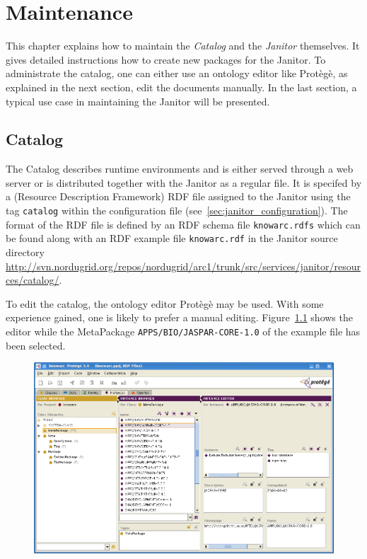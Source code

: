 \chapter{Maintenance}

This chapter explains how to maintain the {\em Catalog} and the {\em Janitor}
themselves.
It gives detailed instructions how to create new packages for the
Janitor.
To administrate the catalog, one can either use an ontology editor 
like Prot\`eg\`e, as explained in the next section, edit the documents
manually.
In the last section, a typical use case in maintaining the Janitor will
be presented.


\section{Catalog}\label{sec:catalog}

The Catalog describes runtime environments and is either served
through a web server or is distributed together with the Janitor as a
regular file.
It is specifed by a (Resource Description Framework) RDF file
assigned to the Janitor using the tag \texttt{catalog} within
the configuration file (see~\ref{sec:janitor_configuration}).
The format of the RDF file is defined by an RDF schema file
\texttt{knowarc.rdfs} which can be found along with an RDF
example file \texttt{knowarc.rdf} in the Janitor source directory
\href{http://svn.nordugrid.org/repos/nordugrid/arc1/trunk/src/services/janitor/resources/catalog/}
{http://svn.nordugrid.org/repos/nordugrid/arc1/trunk/src/services/janitor/resources/catalog/}.

To edit the catalog, the ontology editor Prot\`eg\`e may be
used. With some experience gained, one is likely to prefer a manual editing.
Figure~\ref{fig:protege_example} shows the editor while the
MetaPackage \texttt{APPS/BIO/JASPAR-CORE-1.0} of the example file has
been selected.

\begin{figure}
  \begin{center}
    \includegraphics[width=\textwidth]{images/protege_JASPAR.png}
    \label{fig:protege_example}
  \end{center}
\end{figure}


